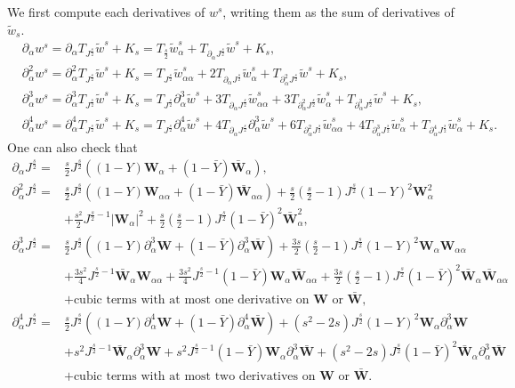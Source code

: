 \documentclass[10pt]{amsart}
\theoremstyle{remark}
\theoremstyle{definition}
\numberwithin{equation}{section}
\newcommand{\p}{\partial}
\newcommand{\al}{\alpha}
\newcommand{\f}{\frac}
\newcommand{\bw}{\mathbf{W}}
\begin{document}
We first compute each derivatives of $w^s$, writing them as the sum of derivatives of $\tilde{w}_s$.
\begin{align*}
&\p_{\al}w^s=\p_{\al}T_{J^{\f{s}{2}}}\tilde{w}^s+K_s=T_{\f{s}{2}}\tilde{w}^s_{\al}+T_{\p_{\al}J^{\f{s}{2}}}\tilde{w}^s+K_s,\\
&\p^2_{\al}w^s=\p^2_{\al}T_{J^{\f{s}{2}}}\tilde{w}^s+K_s=T_{J^{\f{s}{2}}}\tilde{w}^s_{\al\al}+2T_{\p_{\al}J^{\f{s}{2}}}\tilde{w}^s_{\al}+T_{\p^2_{\al}J^{\f{s}{2}}}\tilde{w}^s+K_s,\\
&\p^3_{\al}w^s=\p^3_{\al}T_{J^{\f{s}{2}}}\tilde{w}^s+K_s=T_{J^{\f{s}{2}}}\p^3_{\al}\tilde{w}^s+3T_{\p_{\al}J^{\f{s}{2}}}\tilde{w}^s_{\al\al}+3T_{\p^2_{\al} J^{\f{s}{2}}}\tilde{w}^s_{\al}+T_{\p^3_{\al}J^{\f{s}{2}}}\tilde{w}^s+K_s,\\
&\p^4_{\al}w^s=\p^4_{\al}T_{J^{\f{s}{2}}}\tilde{w}^s+K_s=T_{J^{\f{s}{2}}}\p^4_{\al}\tilde{w}^s+4T_{\p_{\al}J^{\f{s}{2}}}\p^3_{\al}\tilde{w}^s+6T_{\p^2_{\al}J^{\f{s}{2}}}\tilde{w}^s_{\al\al}+4T_{\p^3_{\al}J^{\f{s}{2}}}\tilde{w}^s_{\al}+T_{\p^4_{\al}J^{\f{s}{2}}}\tilde{w}^s_{\al}+K_s.
\end{align*}
One can also check that
\begin{align*}
\p_{\al}J^{\f{s}{2}}=&\f{s}{2} J^{\f{s}{2}}((1-Y)\bw_{\al}+(1-\bar{Y})\bar{\bw}_{\al}),\\
\p^2_{\al}J^{\f{s}{2}}=&\f{s}{2} J^{\f{s}{2}}((1-Y)\bw_{\al\al}+(1-\bar{Y})\bar{\bw}_{\al\al}) +\f{s}{2}\left(\f{s}{2}-1\right)J^{\f{s}{2}}(1-Y)^2\bw^2_{\al}\\
&+\f{s^2}{2} J^{\f{s}{2}-1}|\bw_{\al}|^2+\f{s}{2}\left(\f{s}{2}-1 \right)J^{\f{s}{2}}(1-\bar{Y})^2\bar{\bw}^2_{\al},\\
\p^3_{\al}J^{\f{s}{2}}=&\f{s}{2} J^{\f{s}{2}}((1-Y)\p^3_{\al}\bw+(1-\bar{Y})\p^3_{\al}\bar{\bw})+\f{3s}{2}\left(\f{s}{2}-1 \right)J^{\f{s}{2}}(1-Y)^2\bw_{\al}\bw_{\al\al}\\
&+ \f{3s^2}{4} J^{\f{s}{2}-1}\bar{\bw}_{\al}\bw_{\al\al}+\f{3s^2}{4} J^{\f{s}{2}-1}(1-\bar{Y})\bw_{\al}\bar{\bw}_{\al\al}+\f{3s}{2}\left(\f{s}{2}-1 \right)J^{\f{s}{2}}(1-\bar{Y})^2\bar{\bw}_{\al}\bar{\bw}_{\al\al} \\
&+\text{cubic terms with at most one derivative on $\bw$ or $\bar{\bw}$},\\
\p^4_{\al}J^{\f{s}{2}}=&\f{s}{2} J^{\f{s}{2}}((1-Y)\p^4_{\al}\bw+(1-\bar{Y})\p^4_{\al}\bar{\bw})+\left(s^2-2s\right)J^{\f{s}{2}}(1-Y)^2\bw_{\al}\p^3_{\al}\bw\\
&+s^2 J^{\f{s}{2}-1}\bar{\bw}_{\al}\p^3_{\al}\bw+s^2 J^{\f{s}{2}-1}(1-\bar{Y})\bw_{\al}\p^3_{\al}\bar{\bw} +(s^2 -2s)J^{\f{s}{2}}(1-\bar{Y})^2\bar{\bw}_{\al}\p^3_{\al}\bar{\bw}\\
&+ \text{cubic terms with at most two derivatives on $\bw$ or $\bar{\bw}$}.
\end{align*}
\end{document}
